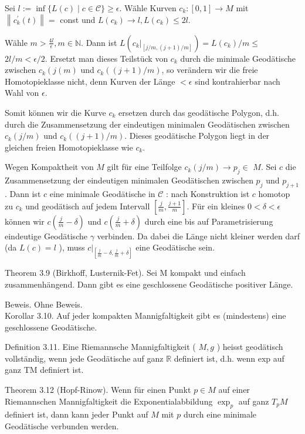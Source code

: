 \documentclass[10pt, letterpaper]{article}
\begin{document}
Sei $l:=\inf \{L(c) \mid c \in \mathcal{C}\} \geq \epsilon$. Wähle Kurven $c_{k}:[0,1] \rightarrow M$ mit $\left\|c_{k}^{\prime}(t)\right\|=$ const und $L\left(c_{k}\right) \rightarrow l, L\left(c_{k}\right) \leq 2 l$.

Wähle $m>\frac{4 l}{\epsilon}, m \in \mathbb{N}$. Dann ist $L\left(\left.c_{k}\right|_{[j / m,(j+1) / m]}\right)=L\left(c_{k}\right) / m \leq$ $2 l / m<\epsilon / 2$. Ersetzt man dieses Teilstück von $c_{k}$ durch die minimale Geodätische zwischen $c_{k}\left(j(m)\right.$ und $c_{k}((j+1) / m)$, so verändern wir die freie Homotopieklasse nicht, denn Kurven der Länge $<\epsilon$ sind kontrahierbar nach Wahl von $\epsilon$.

Somit können wir die Kurve $c_{k}$ ersetzen durch das geodätische Polygon, d.h. durch die Zusammensetzung der eindeutigen minimalen Geodätischen zwischen $c_{k}(j / m)$ und $c_{k}((j+1) / m)$. Dieses geodätische Polygon liegt in der gleichen freien Homotopieklasse wie $c_{k}$.

Wegen Kompaktheit von $M$ gilt für eine Teilfolge $c_{k}(j / m) \rightarrow p_{j} \in$ $M$. Sei $c$ die Zusammensetzung der eindeutigen minimalen Geodätischen zwischen $p_{j}$ und $p_{j+1}$. Dann ist $c$ eine minimale Geodätische in $\mathcal{C}$ : nach Konstruktion ist $c$ homotop zu $c_{k}$ und geodätisch auf jedem Intervall $\left[\frac{j}{m}, \frac{j+1}{m}\right]$. Für ein kleines $0<\delta<\epsilon$ können wir $c\left(\frac{j}{m}-\delta\right)$ und $c\left(\frac{j}{m}+\delta\right)$ durch eine bis auf Parametrisierung eindeutige Geodätische $\gamma$ verbinden. Da dabei die Länge nicht kleiner werden darf (da $L(c)=l$ ), muss $\left.c\right|_{\left[\frac{j}{m}-\delta, \frac{j}{m}+\delta\right]}$ eine Geodätische sein.

Theorem 3.9 (Birkhoff, Lusternik-Fet). Sei M kompakt und einfach zusammenhängend. Dann gibt es eine geschlossene Geodätische positiver Länge.

Beweis. Ohne Beweis.\\
Korollar 3.10. Auf jeder kompakten Mannigfaltigkeit gibt es (mindestens) eine geschlossene Geodätische.

Definition 3.11. Eine Riemannsche Mannigfaltigkeit ( $M, g$ ) heisst geodätisch vollständig, wenn jede Geodätische auf ganz $\mathbb{R}$ definiert ist, d.h. wenn exp auf ganz TM definiert ist.

Theorem 3.12 (Hopf-Rinow). Wenn für einen Punkt $p \in M$ auf einer Riemannschen Mannigfaltigkeit die Exponentialabbildung $\exp _{p}$ auf ganz $T_{p} M$ definiert ist, dann kann jeder Punkt auf $M$ mit $p$ durch eine minimale Geodätische verbunden werden.
\end{document}
